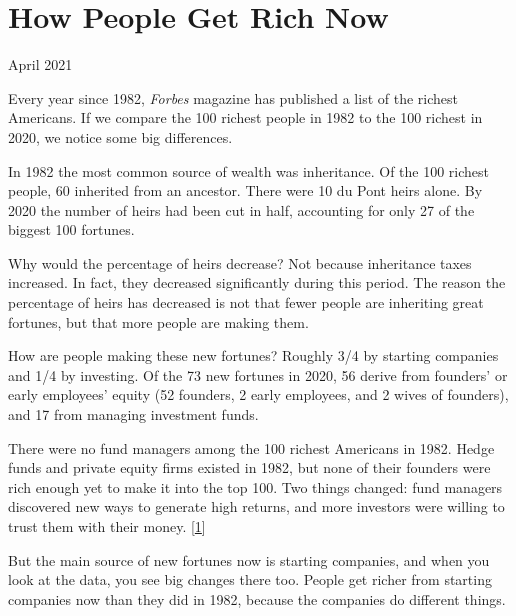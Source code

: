 \chapter{How People Get Rich Now}


            
              
                

April 2021

Every year since 1982,
                  \emph{Forbes} magazine has published a list of the richest
                  Americans. If we compare the 100 richest people in 1982 to the
                  100 richest in 2020, we notice some big differences.

In
                  1982 the most common source of wealth was inheritance. Of the
                  100 richest people, 60 inherited from an ancestor. There were
                  10 du Pont heirs alone. By 2020 the number of heirs had been
                  cut in half, accounting for only 27 of the biggest 100
                  fortunes.

Why would the percentage of heirs
                  decrease? Not because inheritance taxes increased. In fact,
                  they decreased significantly during this period. The reason
                  the percentage of heirs has decreased is not that fewer people
                  are inheriting great fortunes, but that more people are making
                  them.

How are people making these new fortunes?
                  Roughly 3/4 by starting companies and 1/4 by investing. Of the
                  73 new fortunes in 2020, 56 derive from founders' or early
                  employees' equity (52 founders, 2 early employees, and 2 wives
                  of founders), and 17 from managing investment funds.

There
                  were no fund managers among the 100 richest Americans in 1982.
                  Hedge funds and private equity firms existed in 1982, but none
                  of their founders were rich enough yet to make it into the top
                  100. Two things changed: fund managers discovered new ways to
                  generate high returns, and more investors were willing to
                  trust them with their money.
                  [\href{\#f1n}{1}]

But the main source of new fortunes now is
                  starting companies, and when you look at the data, you see big
                  changes there too. People get richer from starting companies
                  now than they did in 1982, because the companies do different
                  things.

